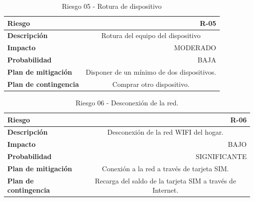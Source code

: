         \begin{table}[H]
        \centering
        \begin{tabular}{|l|c}
        \hline
        \textbf{Riesgo}               & \multicolumn{1}{r|}{R-05}                                             \\ \hline
        \textbf{Descripción}          & \multicolumn{1}{X|}{Rotura del equipo del dispositivo}
        \\ \hline
        \textbf{Impacto}              & \multicolumn{1}{r|}{MODERADO}                                             \\ \hline
        \textbf{Probabilidad}         & \multicolumn{1}{r|}{BAJA}                                         \\ \hline
        \textbf{Plan de mitigación}   & \multicolumn{1}{X|}{ Disponer de un mínimo de dos dispositivos. }
        \\ \hline
        \textbf{Plan de contingencia} & \multicolumn{1}{X|}{Comprar otro dispositivo.}
        \\ \hline
        \end{tabular}
        \caption{Riesgo 05 - Rotura de dispositivo}
        \label{table:riskrotura}
        \end{table}
        \begin{table}[H]
        \centering
        \begin{tabular}{|l|c}
        \hline
        \textbf{Riesgo}               & \multicolumn{1}{r|}{R-06}                                             \\ \hline
        \textbf{Descripción}          & \multicolumn{1}{X|}{ Desconexión de la red WIFI del hogar. }
        \\ \hline
        \textbf{Impacto}              & \multicolumn{1}{r|}{BAJO}                                             \\ \hline
        \textbf{Probabilidad}         & \multicolumn{1}{r|}{SIGNIFICANTE}                                         \\ \hline
        \textbf{Plan de mitigación}   & \multicolumn{1}{X|}{ Conexión a la red a través de tarjeta SIM. }
        \\ \hline
        \textbf{Plan de contingencia} & \multicolumn{1}{X|}{ Recarga del saldo de la tarjeta SIM a través de Internet. }
        \\ \hline
        \end{tabular}
        \caption{Riesgo 06 - Desconexión de la red. }
        \label{table:riskdisconn}
        \end{table}
